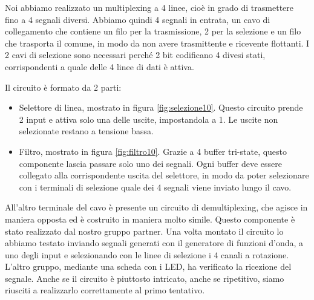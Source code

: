 Noi abbiamo realizzato un multiplexing a 4 linee, cioè in grado di trasmettere fino a 4 segnali diversi.
Abbiamo quindi 4 segnali in entrata, un cavo di collegamento che contiene un filo per la trasmissione, 2 per
la selezione e un filo che trasporta il comune, in modo da non avere trasmittente e ricevente flottanti.
I 2 cavi di selezione sono necessari perché 2 bit codificano 4 divesi stati, corrispondenti a quale delle 4
linee di dati è attiva.

Il circuito è formato da 2 parti:

\begin{itemize}
    \item{Selettore di linea, mostrato in figura \ref{fig:selezione10}. Questo circuito prende 2 input e
        attiva solo una delle uscite, impostandola a 1. Le uscite non selezionate restano a tensione bassa.}
    \item{Filtro, mostrato in figura \ref{fig:filtro10}. Grazie a 4 buffer tri-state, questo componente lascia
        passare solo uno dei segnali. Ogni buffer deve essere collegato alla corrispondente uscita del selettore,
        in modo da poter selezionare con i terminali di selezione quale dei 4 segnali viene inviato lungo il cavo.}
\end{itemize}

All'altro terminale del cavo è presente un circuito di demultiplexing, che agisce in maniera opposta ed è costruito in
maniera molto simile. Questo componente è stato realizzato dal nostro gruppo partner. Una volta montato il circuito
lo abbiamo testato inviando segnali generati con il generatore di funzioni d'onda, a uno degli input e selezionando
con le linee di selezione i 4 canali a rotazione. L'altro gruppo, mediante una scheda con i LED, ha verificato
la ricezione del segnale. Anche se il circuito è piuttosto intricato, anche se ripetitivo, siamo riusciti a realizzarlo
correttamente al primo tentativo.
